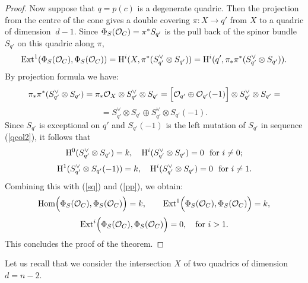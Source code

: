 \documentclass[12pt]{article}
\begin{document}
\begin{proof}
Now suppose that $q=p(c)$ is a degenerate quadric. Then the  projection from the centre of the cone gives a double covering $\pi:X\longrightarrow q'$ from $X$ to a quadric of dimension $\ d-1$. Since $\Phi_S({\cal O}_C)=\pi^*S_{q'}$ is the pull back of the spinor bundle $S_{q'}$ on this quadric along $\pi$, 
\begin{equation}\label{sq}
{\rm Ext}^1(\Phi_S({\cal O}_C),\Phi_S({\cal O}_C))=
{\rm H}^i(X,\pi^*(S^{\vee}_{q'}\otimes S_{q'}))=
{\rm H}^i(q',\pi_*\pi^*(S^{\vee}_{q'}\otimes S_{q'})).
\end{equation}
By projection formula we have:
$$
\pi_*\pi^*(S^{\vee}_{q'}\otimes S_{q'})=\pi_*{\cal O}_X\otimes S^{\vee}_{q'}\otimes S_{q'}=\Bigl[ {\cal O}_{q'}\oplus {\cal O}_{q'}(-1)\Bigr]\otimes S^{\vee}_{q'}\otimes S_{q'}=
$$
\begin{equation}\label{pp}
=S^{\vee}_{q'}\otimes S_{q'}\oplus S^{\vee}_{q'}\otimes S_{q'}(-1).
\end{equation}
Since $S_{q'}$ is exceptional on $q'$ and $S_{q'}(-1)$ is the left mutation of $S_{q'}$ in sequence (\ref{qcol2}), it follows that
$$
{\rm H}^0(S^{\vee}_{q'}\otimes S_{q'})=k,\quad 
{\rm H}^i(S^{\vee}_{q'}\otimes S_{q'})=0 \ \ {\rm for}\ i\not=0;
$$
$$
{\rm H}^1(S^{\vee}_{q'}\otimes S_{q'}(-1))=k,\quad 
{\rm H}^i(S^{\vee}_{q'}\otimes S_{q'})=0 \ \ {\rm for}\ i\not=1.
$$
Combining this with (\ref{sq}) and (\ref{pp}), we obtain:
$$
{\rm Hom}\Bigl(\Phi_S({\cal O}_C),\Phi_S({\cal O}_C)\Bigr)=k,\qquad {\rm Ext}^1\Bigl(\Phi_S({\cal O}_C),\Phi_S({\cal O}_C)\Bigr)=k,
$$
$$
{\rm Ext}^i\Bigl(\Phi_S({\cal O}_C),\Phi_S({\cal O}_C)\Bigr)=0,\quad{\rm for}\ i>1.
$$
This concludes the proof of the theorem.
\end{proof}

Let us recall that we consider the intersection $X$ of two quadrics of dimension $d=n-2.$
\end{document}
